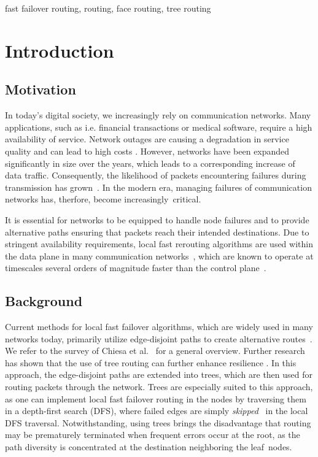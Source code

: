 \documentclass[conference]{IEEEtran}
\begin{document}
\begin{IEEEkeywords}
    fast failover routing, routing, face routing, tree routing
\end{IEEEkeywords}

\section{Introduction}
\subsection{Motivation}
In today's digital society, we increasingly rely on communication networks. Many applications, 
such as i.e. financial transactions or medical software, require a high availability of service. 
Network outages are causing a degradation in service quality \cite{blackHolesInternetHubble} 
and can lead to high costs \cite{surveyInternetOutages}. 
However, networks have been expanded significantly in size over the years, which leads to a 
corresponding increase of data traffic.
Consequently, the likelihood of packets encountering failures during transmission has grown~\cite{measurementsFailuresDataCenters}.
In the modern era, managing failures of communication networks has, therfore, become increasingly~critical. 

It is essential for networks to be equipped to handle node failures and to provide 
alternative paths ensuring that packets reach their intended destinations.
Due to stringent availability requirements, local fast rerouting algorithms are used within 
the data plane in many communication networks~\cite{DBLP:journals/comsur/ChiesaKRRS21}, which are known to operate at timescales several orders 
of magnitude faster than the control plane~\cite{DBLP:conf/nsdi/LiuPSGSS13}.

\subsection{Background}
Current methods for local fast failover algorithms, which are widely used in many networks today, 
primarily utilize edge-disjoint paths to create alternative routes~\cite{only-edp1,only-edp2}. 
We refer to the survey of Chiesa et al.~\cite{DBLP:journals/comsur/ChiesaKRRS21} for a general overview.
Further research has shown that the use of tree routing can further enhance resilience \cite{tree}.
In this approach, the edge-disjoint paths are extended into trees, which are then used for routing packets through the network.
Trees are especially suited to this approach, as one can implement local fast failover routing in the nodes by traversing them in a depth-first search (DFS), where failed edges are simply \emph{skipped}~\cite{DBLP:conf/apocs/FoersterHPST21} in the local DFS traversal.
Notwithstanding, using trees brings the disadvantage that routing may be prematurely terminated when 
frequent errors occur at the root, as the path diversity is concentrated at the destination neighboring the leaf~nodes.
\end{document}

